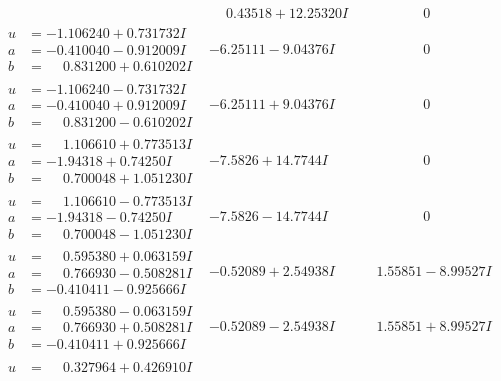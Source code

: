 \documentclass[1p]{elsarticle_modified}
\theoremstyle{definition}
\begin{document}
$$\begin{array}{c|c|c}
 & \phantom{-}0.43518 + 12.25320 I & \phantom{-0.000000 } 0 \\ \hline\begin{aligned}
u &= -1.106240 + 0.731732 I \\
a &= -0.410040 - 0.912009 I \\
b &= \phantom{-}0.831200 + 0.610202 I\end{aligned}
 & -6.25111 - 9.04376 I & \phantom{-0.000000 } 0 \\ \hline\begin{aligned}
u &= -1.106240 - 0.731732 I \\
a &= -0.410040 + 0.912009 I \\
b &= \phantom{-}0.831200 - 0.610202 I\end{aligned}
 & -6.25111 + 9.04376 I & \phantom{-0.000000 } 0 \\ \hline\begin{aligned}
u &= \phantom{-}1.106610 + 0.773513 I \\
a &= -1.94318 + 0.74250 I \\
b &= \phantom{-}0.700048 + 1.051230 I\end{aligned}
 & -7.5826 + 14.7744 I & \phantom{-0.000000 } 0 \\ \hline\begin{aligned}
u &= \phantom{-}1.106610 - 0.773513 I \\
a &= -1.94318 - 0.74250 I \\
b &= \phantom{-}0.700048 - 1.051230 I\end{aligned}
 & -7.5826 - 14.7744 I & \phantom{-0.000000 } 0 \\ \hline\begin{aligned}
u &= \phantom{-}0.595380 + 0.063159 I \\
a &= \phantom{-}0.766930 - 0.508281 I \\
b &= -0.410411 - 0.925666 I\end{aligned}
 & -0.52089 + 2.54938 I & \phantom{-}1.55851 - 8.99527 I \\ \hline\begin{aligned}
u &= \phantom{-}0.595380 - 0.063159 I \\
a &= \phantom{-}0.766930 + 0.508281 I \\
b &= -0.410411 + 0.925666 I\end{aligned}
 & -0.52089 - 2.54938 I & \phantom{-}1.55851 + 8.99527 I \\ \hline\begin{aligned}
u &= \phantom{-}0.327964 + 0.426910 I \\

\end{aligned}
\end{array}$$
\end{document}
